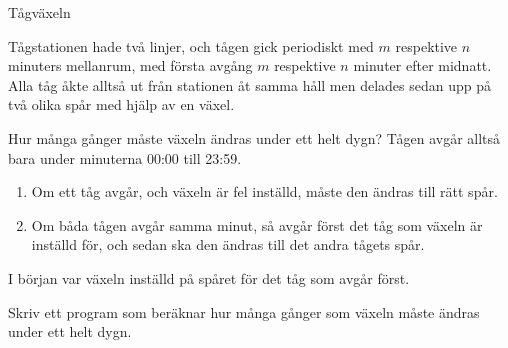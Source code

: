 \documentclass[10pt]{beamer}
\begin{document}
\begin{frame}{Tågväxeln}

Tågstationen hade två linjer, och tågen gick periodiskt med $m$ respektive $n$ minuters mellanrum, med första avgång $m$ respektive $n$ minuter efter midnatt. Alla tåg åkte alltså ut från stationen åt samma håll men delades sedan upp på två olika spår med hjälp av en växel. 

Hur många gånger måste växeln ändras under ett helt dygn? Tågen avgår alltså bara under minuterna 00:00 till 23:59.

\begin{enumerate}
\item Om ett tåg avgår, och växeln är fel inställd, måste den ändras till rätt spår.
\item Om båda tågen avgår samma minut, så avgår först det tåg som växeln är inställd för, och sedan ska den ändras till det andra tågets spår.
\end{enumerate}

I början var växeln inställd på spåret för det tåg som avgår först.

Skriv ett program som beräknar hur många gånger som växeln måste ändras under ett helt dygn.


\end{frame}
\end{document}
